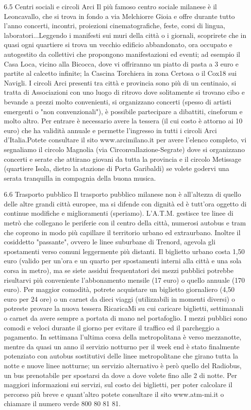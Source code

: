 6.5 Centri sociali e circoli Arci
Il più famoso centro sociale milanese è il Leoncavallo, che si trova in fondo a via Melchiorre Gioia e offre durante tutto l'anno concerti, incontri, proiezioni cinematografiche, feste, corsi di lingua, laboratori...Leggendo i manifesti sui muri della città o i giornali, scoprirete che in quasi ogni quartiere si trova un vecchio edificio abbandonato, ora occupato e autogestito da collettivi che propongono manifestazioni ed eventi; ad esempio il Casa Loca, vicino alla Bicocca, dove vi offriranno un piatto di pasta a 3 euro e partite al calcetto infinite; la Cascina Torchiera in zona Certosa o il Cox18 sui Navigli.
I circoli Arci presenti tra città e provincia sono più di un centinaio, si tratta di Associazioni con uno luogo di ritrovo dove solitamente si trovano cibo e bevande a prezzi molto convenienti, si organizzano concerti (spesso di artisti emergenti o "non convenzionali"), è possibile partecipare a dibattiti, cineforum e molto altro. 
Per entrare è necessario avere la tessera (il cui costo è attorno ai 10 euro) che ha validità annuale e permette l'ingresso in tutti i circoli Arci d'Italia.Potete consultare il sito www.arcimilano.it per avere l'elenco completo, vi segnaliamo il circolo Magnolia (via Circonvallazione-Segrate) dove si organizzano concerti e serate che attirano giovani da tutta la provincia e il circolo Metissage (quartiere Isola, dietro la stazione di Porta Garibaldi) se volete godervi una serata tranquilla in compagnia della buona musica.

6.6 Trasporto pubblico
Il trasporto pubblico milanese non è all'altezza di quello delle altre grandi città europee, ma si difende con dignità ed è tutt'ora oggetto di continue modifiche e miglioramenti (speriamo). L'A.T.M. gestisce tre linee di metrò che collegano le periferie con il centro della città, numerosi autobus e tram che coprono in modo più capillare il territorio urbano ed extraurbano. Inoltre il cosiddetto "passante", ovvero le linee suburbane di Trenord, agevola gli spostamenti verso comuni leggermente più distanti. 
Il biglietto urbano costa 1,50 euro (valido per un'ora e un quarto per spostamenti interni alla città e una sola corsa in metro), ma se siete assidui frequentatori dei mezzi pubblici potrebbe risultarvi più conveniente l'abbonamento mensile (17 euro) o quello annuale (170 euro). Per maggior comodità, potrete acquistare un biglietto giornaliero (4,50 euro per 24 ore) o un carnet da dieci viaggi (utilizzabili in momenti diversi) o potreste provare la nuova tessera RicaricaMi su cui caricare biglietti, settimanali o carnet da avere sempre a portata di mano nel portafoglio.
I mezzi pubblici sono comodi e veloci durante il giorno per evitare il traffico ed il parcheggio a pagamento. In settimana l'ultima corsa della metropolitana è verso mezzanotte, mentre da quasi un anno il servizio notturno per il week end è stato finalmente potenziato con autobus sostitutivi delle linee metropolitane che girano tutta la notte e nuove linee notturne; un servizio alternativo è però quello del Radiobus, un bus prenotabile per spostarsi da dove a dove volete fino alle 2 di notte.
Per maggiori informazioni sui servizi, sul costo dei biglietti, per poter calcolare il percorso più breve e quant'altro potete consultare il sito www.atm-mi.it o chiamare il numero verde 800 80 81 81. 
